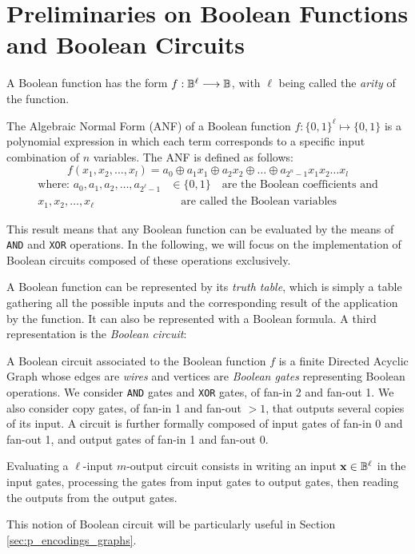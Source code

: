 \section{Preliminaries on Boolean Functions and Boolean Circuits}
\label{sec:p_encodings_preliminaries_boolean}


A Boolean function has the form $f: \mathbb{B}^\ell \longrightarrow \mathbb{B}$, with $\ell$ being called the \emph{arity} of the function. 

\begin{definition}
    
The Algebraic Normal Form (ANF) of a Boolean function $f: \{0,1\}^\ell \mapsto \{0,1\}$ is a polynomial expression in which each term corresponds to a specific input combination of $n$ variables. The ANF is defined as follows: \[f(x_1, x_2, \ldots, x_l) = a_0 \oplus a_1x_1 \oplus a_2x_2 \oplus \ldots \oplus a_{2^n-1}x_1x_2\ldots x_l\] \begin{align*}
\text{where: }a_0, a_1, a_2, \ldots, a_{2^\ell-1} & \in \{0,1\} \quad \text{are the Boolean coefficients and} \\
x_1, x_2, \ldots, x_\ell & \quad \text{are called the Boolean variables}
\end{align*}
\end{definition}

This result means that any Boolean function can be evaluated by the means of \texttt{AND} and \texttt{XOR} operations. In the following, we will focus on the implementation of Boolean circuits composed of these operations exclusively.


A Boolean function can be represented by its \emph{truth table}, which is simply a table gathering all the possible inputs and the corresponding result of the application by the function. It can also be represented with a Boolean formula. A third representation is the \emph{Boolean circuit}:

\begin{definition}
    A Boolean circuit associated to the Boolean function $f$ is a finite Directed Acyclic Graph whose edges are \emph{wires} and vertices are \emph{Boolean gates} representing Boolean operations. We consider \texttt{AND} gates and \texttt{XOR} gates, of fan-in 2 and fan-out 1. We also consider copy gates, of fan-in 1 and fan-out $>1$, that outputs several copies of its input. A circuit is further formally composed of input gates of fan-in 0 and fan-out 1, and output gates of fan-in 1 and fan-out 0.
    
    Evaluating a $\ell$-input $m$-output circuit consists in writing an input $\mathbf{x} \in \mathbb{B}^\ell$ in the input gates, processing the gates from input gates to output gates, then reading the outputs from the output gates.
	\label{def:boolean_circuit}
\end{definition}


This notion of Boolean circuit will be particularly useful in Section \ref{sec:p_encodings_graphs}.

